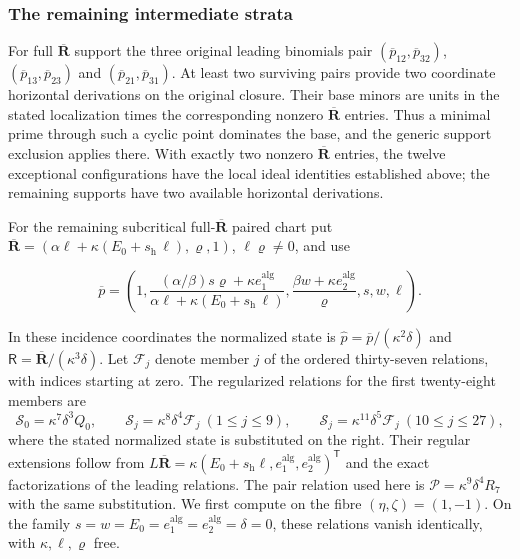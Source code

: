 \documentclass[11pt,a4paper]{article}
\numberwithin{equation}{section}
\theoremstyle{plain}
\theoremstyle{definition}
\theoremstyle{remark}
\begin{document}
\subsubsection{The remaining intermediate strata}

For full $\overline{\boldsymbol R}$ support the three original leading binomials pair $(\overline p_{12},\overline p_{32})$, $(\overline p_{13},\overline p_{23})$ and $(\overline p_{21},\overline p_{31})$. At least two surviving pairs provide two coordinate horizontal derivations on the original closure. Their base minors are units in the stated localization times the corresponding nonzero $\overline{\boldsymbol R}$ entries. Thus a minimal prime through such a cyclic point dominates the base, and the generic support exclusion applies there.  With exactly two nonzero $\overline{\boldsymbol R}$ entries, the twelve exceptional configurations have the local ideal identities established above; the remaining supports have two available horizontal derivations.

For the remaining subcritical full-$\overline{\boldsymbol R}$ paired chart put $\overline{\boldsymbol R}=(\alpha\ell+\kappa(E_0+s_{\mathrm h}\,\ell),\varrho,1)$, $\ell\varrho\ne0$, and use

\begin{equation}\overline p=\left(1,\frac{(\alpha/\beta)s\varrho+\kappa e_1^{\mathrm{alg}}}{\alpha\ell+\kappa(E_0+s_{\mathrm h}\,\ell)},\frac{\beta w+\kappa e_2^{\mathrm{alg}}}{\varrho},s,w,\ell\right).\end{equation}

In these incidence coordinates the normalized state is
$\widehat p=\overline p/(\kappa^2\delta)$ and
$\mathsf R=\overline{\boldsymbol R}/(\kappa^3\delta)$.
Let $\mathscr F_j$ denote member $j$ of the ordered thirty-seven relations,
with indices starting at zero. The regularized
relations for the first twenty-eight members are
\[
 \mathcal S_0=\kappa^7\delta^3Q_0,\qquad
 \mathcal S_j=\kappa^8\delta^4\mathscr F_j\ (1\le j\le9),\qquad
 \mathcal S_j=\kappa^{11}\delta^5\mathscr F_j\ (10\le j\le27),
\]
where the stated normalized state is substituted on the right. Their
regular extensions follow from $L\overline{\boldsymbol R}
=\kappa(E_0+s_{\mathrm h}\ell,e_1^{\mathrm{alg}},e_2^{\mathrm{alg}})^{\mathsf T}$ and the exact
factorizations of the leading relations. The pair relation used here is
$\mathcal P=\kappa^9\delta^4R_7$ with the same substitution.
We first compute on the fibre $(\eta,\zeta)=(1,-1)$.
On the family $s=w=E_0=e_1^{\mathrm{alg}}=e_2^{\mathrm{alg}}=\delta=0$, these relations vanish identically,
with $\kappa,\ell,\varrho$ free.
\end{document}
